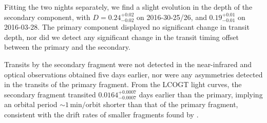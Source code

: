 \documentclass[apj]{emulateapj}
\begin{document}
Fitting the two nights separately, we find a slight evolution in the depth of the secondary component, with $D=0.24_{-0.02}^{+0.02}$ on 2016-30-25/26, and $0.19_{-0.01}^{+0.01}$ on 2016-03-28. The primary component displayed no significant change in transit depth, nor did we detect any significant change in the transit timing offset between the primary and the secondary.

Transits by the secondary fragment were not detected in the near-infrared and optical observations obtained five days earlier, nor were any asymmetries detected in the transits of the primary fragment. From the LCOGT light curves, the secondary fragment transited $0.0164_{-0.0007}^{+0.0007}$ days earlier than the primary, implying an orbital period $\sim 1\,\mathrm{min/orbit}$ shorter than that of the primary fragment, consistent with the drift rates of smaller fragments found by \citet{2016MNRAS.tmp..406R}.   
\end{document}
